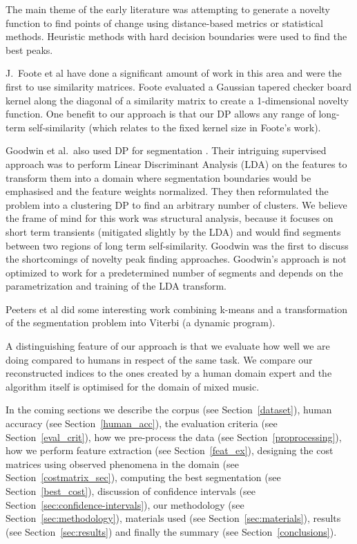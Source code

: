 \documentclass[twocolumn]{article}
\begin{document}
	The main theme of the early literature was attempting to generate a novelty function to find points of change using distance-based metrics or statistical methods. Heuristic methods with hard decision boundaries were used to find the best peaks. 
	
	J.\ Foote et al \citep{foote1999visualizing,foote1997similarity,foote2000automatic,foote2003media,foote2001visualizing} have done a significant amount of work in this area and were the first to use similarity matrices. Foote evaluated a Gaussian tapered checker board kernel along the diagonal of a similarity matrix to create a 1-dimensional novelty function. One benefit to our approach is that our DP allows any range of long-term self-similarity (which relates to the fixed kernel size in Foote's work).
	
	Goodwin et al.\ also used DP for segmentation \citep{goodwin2003audio,goodwin2004dynamic}. Their intriguing supervised approach was to perform Linear Discriminant Analysis (LDA) on the features to transform them into a domain where segmentation boundaries would be emphasised and the feature weights normalized. They then reformulated the problem into a clustering DP to find an arbitrary number of clusters. We believe the frame of mind for this work was structural analysis, because it focuses on short term transients (mitigated slightly by the LDA) and would find segments between two regions of long term self-similarity. Goodwin was the first to discuss the shortcomings of novelty peak finding approaches. Goodwin's approach is not optimized to work for a predetermined number of segments and depends on the parametrization and training of the LDA transform. 
	
	Peeters et al \citep{peeters2002toward,peeters2004deriving} did some interesting work combining k-means and a transformation of the segmentation problem into Viterbi (a dynamic program).
	
	A distinguishing feature of our approach is that we evaluate how well we are doing compared to humans in respect of the same task. We compare our reconstructed indices to the ones created by a human domain expert and the algorithm itself is optimised for the domain of mixed music. 
	
	In the coming sections we describe the corpus (see Section~\ref{dataset}), human accuracy (see Section~\ref{human_acc}),  the evaluation criteria (see Section~\ref{eval_crit}), how we pre-process the data (see Section~\ref{proprocessing}), how we perform feature extraction (see Section~\ref{feat_ex}), designing the cost matrices using observed phenomena in the domain (see Section~\ref{costmatrix_sec}), computing the best segmentation (see Section~\ref{best_cost}), discussion of confidence intervals (see Section~\ref{sec:confidence-intervals}), our methodology (see Section~\ref{sec:methodology}), materials used (see Section~\ref{sec:materials}), results (see Section~\ref{sec:results}) and finally the summary (see Section~\ref{conclusions}).
	
\end{document}
